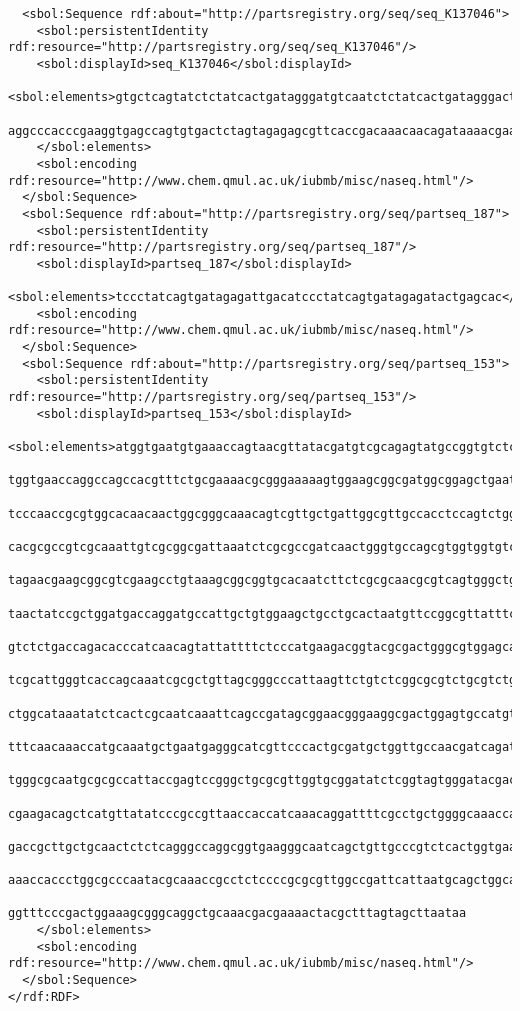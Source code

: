 \begin{minipage}{0.95\textwidth} 
\begin{lstlisting}
  <sbol:Sequence rdf:about="http://partsregistry.org/seq/seq_K137046">
    <sbol:persistentIdentity rdf:resource="http://partsregistry.org/seq/seq_K137046"/>
    <sbol:displayId>seq_K137046</sbol:displayId>
    <sbol:elements>gtgctcagtatctctatcactgatagggatgtcaatctctatcactgatagggactctagtatataaacgcagaa
                   aggcccacccgaaggtgagccagtgtgactctagtagagagcgttcaccgacaaacaacagataaaacgaaaggc
    </sbol:elements>
    <sbol:encoding rdf:resource="http://www.chem.qmul.ac.uk/iubmb/misc/naseq.html"/>
  </sbol:Sequence>
  <sbol:Sequence rdf:about="http://partsregistry.org/seq/partseq_187">
    <sbol:persistentIdentity rdf:resource="http://partsregistry.org/seq/partseq_187"/>
    <sbol:displayId>partseq_187</sbol:displayId>
    <sbol:elements>tccctatcagtgatagagattgacatccctatcagtgatagagatactgagcac</sbol:elements>
    <sbol:encoding rdf:resource="http://www.chem.qmul.ac.uk/iubmb/misc/naseq.html"/>
  </sbol:Sequence>
  <sbol:Sequence rdf:about="http://partsregistry.org/seq/partseq_153">
    <sbol:persistentIdentity rdf:resource="http://partsregistry.org/seq/partseq_153"/>
    <sbol:displayId>partseq_153</sbol:displayId>
    <sbol:elements>atggtgaatgtgaaaccagtaacgttatacgatgtcgcagagtatgccggtgtctcttatcagaccgtttcccgcg
                   tggtgaaccaggccagccacgtttctgcgaaaacgcgggaaaaagtggaagcggcgatggcggagctgaattacat
                   tcccaaccgcgtggcacaacaactggcgggcaaacagtcgttgctgattggcgttgccacctccagtctggccctg
                   cacgcgccgtcgcaaattgtcgcggcgattaaatctcgcgccgatcaactgggtgccagcgtggtggtgtcgatgg
                   tagaacgaagcggcgtcgaagcctgtaaagcggcggtgcacaatcttctcgcgcaacgcgtcagtgggctgatcat
                   taactatccgctggatgaccaggatgccattgctgtggaagctgcctgcactaatgttccggcgttatttcttgat
                   gtctctgaccagacacccatcaacagtattattttctcccatgaagacggtacgcgactgggcgtggagcatctgg
                   tcgcattgggtcaccagcaaatcgcgctgttagcgggcccattaagttctgtctcggcgcgtctgcgtctggctgg
                   ctggcataaatatctcactcgcaatcaaattcagccgatagcggaacgggaaggcgactggagtgccatgtccggt
                   tttcaacaaaccatgcaaatgctgaatgagggcatcgttcccactgcgatgctggttgccaacgatcagatggcgc
                   tgggcgcaatgcgcgccattaccgagtccgggctgcgcgttggtgcggatatctcggtagtgggatacgacgatac
                   cgaagacagctcatgttatatcccgccgttaaccaccatcaaacaggattttcgcctgctggggcaaaccagcgtg
                   gaccgcttgctgcaactctctcagggccaggcggtgaagggcaatcagctgttgcccgtctcactggtgaaaagaa
                   aaaccaccctggcgcccaatacgcaaaccgcctctccccgcgcgttggccgattcattaatgcagctggcacgaca
                   ggtttcccgactggaaagcgggcaggctgcaaacgacgaaaactacgctttagtagcttaataa
    </sbol:elements>
    <sbol:encoding rdf:resource="http://www.chem.qmul.ac.uk/iubmb/misc/naseq.html"/>
  </sbol:Sequence>
</rdf:RDF>
\end{lstlisting}
\end{minipage}



